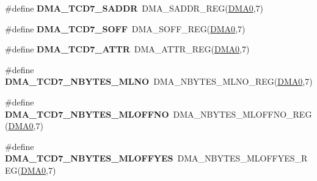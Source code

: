 \begin{DoxyCompactItemize}
\item 
\#define {\bfseries D\+M\+A\+\_\+\+T\+C\+D7\+\_\+\+S\+A\+D\+DR}~D\+M\+A\+\_\+\+S\+A\+D\+D\+R\+\_\+\+R\+EG(\hyperlink{group__DMA__Peripheral__Access__Layer_ga4103044f9ca209772f513dc694513ffb}{D\+M\+A0},7)\hypertarget{group__DMA__Register__Accessor__Macros_ga2c17a6742312a4098c6492219ff8807e}{}\label{group__DMA__Register__Accessor__Macros_ga2c17a6742312a4098c6492219ff8807e}

\item 
\#define {\bfseries D\+M\+A\+\_\+\+T\+C\+D7\+\_\+\+S\+O\+FF}~D\+M\+A\+\_\+\+S\+O\+F\+F\+\_\+\+R\+EG(\hyperlink{group__DMA__Peripheral__Access__Layer_ga4103044f9ca209772f513dc694513ffb}{D\+M\+A0},7)\hypertarget{group__DMA__Register__Accessor__Macros_gae369bbdf8d7426f5285a701adc541862}{}\label{group__DMA__Register__Accessor__Macros_gae369bbdf8d7426f5285a701adc541862}

\item 
\#define {\bfseries D\+M\+A\+\_\+\+T\+C\+D7\+\_\+\+A\+T\+TR}~D\+M\+A\+\_\+\+A\+T\+T\+R\+\_\+\+R\+EG(\hyperlink{group__DMA__Peripheral__Access__Layer_ga4103044f9ca209772f513dc694513ffb}{D\+M\+A0},7)\hypertarget{group__DMA__Register__Accessor__Macros_ga948cb5ad1adb59b3c6b0560f2529efbe}{}\label{group__DMA__Register__Accessor__Macros_ga948cb5ad1adb59b3c6b0560f2529efbe}

\item 
\#define {\bfseries D\+M\+A\+\_\+\+T\+C\+D7\+\_\+\+N\+B\+Y\+T\+E\+S\+\_\+\+M\+L\+NO}~D\+M\+A\+\_\+\+N\+B\+Y\+T\+E\+S\+\_\+\+M\+L\+N\+O\+\_\+\+R\+EG(\hyperlink{group__DMA__Peripheral__Access__Layer_ga4103044f9ca209772f513dc694513ffb}{D\+M\+A0},7)\hypertarget{group__DMA__Register__Accessor__Macros_ga110b7288144f75de7dc00a04c099653f}{}\label{group__DMA__Register__Accessor__Macros_ga110b7288144f75de7dc00a04c099653f}

\item 
\#define {\bfseries D\+M\+A\+\_\+\+T\+C\+D7\+\_\+\+N\+B\+Y\+T\+E\+S\+\_\+\+M\+L\+O\+F\+F\+NO}~D\+M\+A\+\_\+\+N\+B\+Y\+T\+E\+S\+\_\+\+M\+L\+O\+F\+F\+N\+O\+\_\+\+R\+EG(\hyperlink{group__DMA__Peripheral__Access__Layer_ga4103044f9ca209772f513dc694513ffb}{D\+M\+A0},7)\hypertarget{group__DMA__Register__Accessor__Macros_ga6dea6a9aae6fc4c980f6f7a3809c93db}{}\label{group__DMA__Register__Accessor__Macros_ga6dea6a9aae6fc4c980f6f7a3809c93db}

\item 
\#define {\bfseries D\+M\+A\+\_\+\+T\+C\+D7\+\_\+\+N\+B\+Y\+T\+E\+S\+\_\+\+M\+L\+O\+F\+F\+Y\+ES}~D\+M\+A\+\_\+\+N\+B\+Y\+T\+E\+S\+\_\+\+M\+L\+O\+F\+F\+Y\+E\+S\+\_\+\+R\+EG(\hyperlink{group__DMA__Peripheral__Access__Layer_ga4103044f9ca209772f513dc694513ffb}{D\+M\+A0},7)\hypertarget{group__DMA__Register__Accessor__Macros_ga081d406e1d570ce8c4a6c977e00d0201}{}\label{group__DMA__Register__Accessor__Macros_ga081d406e1d570ce8c4a6c977e00d0201}


\end{DoxyCompactItemize}
